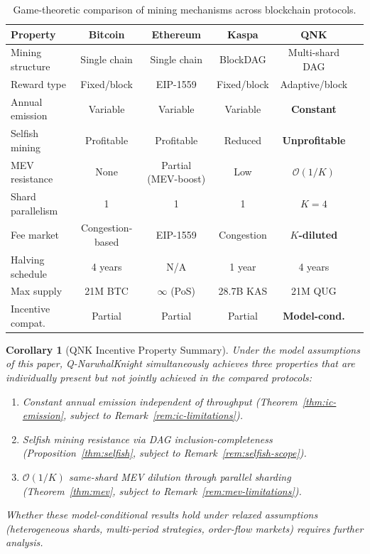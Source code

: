 \documentclass[11pt,a4paper]{article}
\newtheorem{corollary}[theorem]{Corollary}
\theoremstyle{definition}
\theoremstyle{remark}
\newcommand{\QNK}{\textsf{Q-NarwhalKnight}}
\newcommand{\bigO}{\mathcal{O}}
\begin{document}
\begin{table}[t]
\centering
\caption{Game-theoretic comparison of mining mechanisms across blockchain
protocols.}
\label{tab:comparison}
\begin{tabular}{@{}lccccc@{}}
\toprule
\textbf{Property} & \textbf{Bitcoin} & \textbf{Ethereum} &
\textbf{Kaspa} & \textbf{QNK} \\
\midrule
Mining structure & Single chain & Single chain & BlockDAG & Multi-shard DAG \\
Reward type & Fixed/block & EIP-1559 & Fixed/block & Adaptive/block \\
Annual emission & Variable & Variable & Variable & \textbf{Constant} \\
Selfish mining & Profitable & Profitable & Reduced & \textbf{Unprofitable} \\
MEV resistance & None & Partial (MEV-boost) & Low & \textbf{$\bigO(1/K)$} \\
Shard parallelism & 1 & 1 & 1 & \textbf{$K=4$} \\
Fee market & Congestion-based & EIP-1559 & Congestion & \textbf{$K$-diluted} \\
Halving schedule & 4 years & N/A & 1 year & 4 years \\
Max supply & 21M BTC & $\infty$ (PoS) & 28.7B KAS & 21M QUG \\
Incentive compat.\ & Partial & Partial & Partial & \textbf{Model-cond.} \\
\bottomrule
\end{tabular}
\end{table}

\begin{corollary}[QNK Incentive Property Summary]\label{cor:dominance}
Under the model assumptions of this paper, \QNK{} simultaneously
achieves three properties that are individually present but not
jointly achieved in the compared protocols:
\begin{enumerate}[label=(\roman*),nosep]
  \item Constant annual emission independent of throughput
    (Theorem~\ref{thm:ic-emission}, subject to
    Remark~\ref{rem:ic-limitations}).
  \item Selfish mining resistance via DAG inclusion-completeness
    (Proposition~\ref{thm:selfish}, subject to
    Remark~\ref{rem:selfish-scope}).
  \item $\bigO(1/K)$ same-shard MEV dilution through parallel sharding
    (Theorem~\ref{thm:mev}, subject to
    Remark~\ref{rem:mev-limitations}).
\end{enumerate}
Whether these model-conditional results hold under relaxed assumptions
(heterogeneous shards, multi-period strategies, order-flow markets)
requires further analysis.
\end{corollary}
\end{document}
